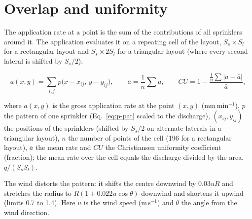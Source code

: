 \section{Overlap and uniformity}
The application rate at a point is the sum of the contributions of all sprinklers around it. The application evaluates it on a repeating cell of the layout, $S_s\times S_l$ for a rectangular layout and $S_s\times2S_l$ for a triangular layout (where every second lateral is shifted by $S_s/2$):

\begin{equation}\boxed{a(x,y)=\sum_{i,j}p\bigl(x-x_{ij},\,y-y_{ij}\bigr),\qquad \overline{a}=\frac{1}{n}\sum a,\qquad CU=1-\frac{\frac1n\sum|a-\bar a|}{\bar a},}\label{eq:p-cu}\end{equation}
\par\noindent where $a(x,y)$ is the gross application rate at the point $(x,y)$ (mm\,min$^{-1}$), $p$ the pattern of one sprinkler (Eq.~\ref{eq:p-pat} scaled to the discharge), $(x_{ij},y_{ij})$ the positions of the sprinklers (shifted by $S_s/2$ on alternate laterals in a triangular layout), $n$ the number of points of the cell (196 for a rectangular layout), $\bar a$ the mean rate and $CU$ the Christiansen uniformity coefficient (fraction); the mean rate over the cell equals the discharge divided by the area, $q/(S_sS_l)$.



The wind distorts the pattern: it shifts the centre downwind by $0.03uR$ and stretches the radius to $R(1+0.022u\cos\theta)$ downwind and shortens it upwind (limits 0.7 to 1.4). Here $u$ is the wind speed (m\,s$^{-1}$) and $\theta$ the angle from the wind direction.

